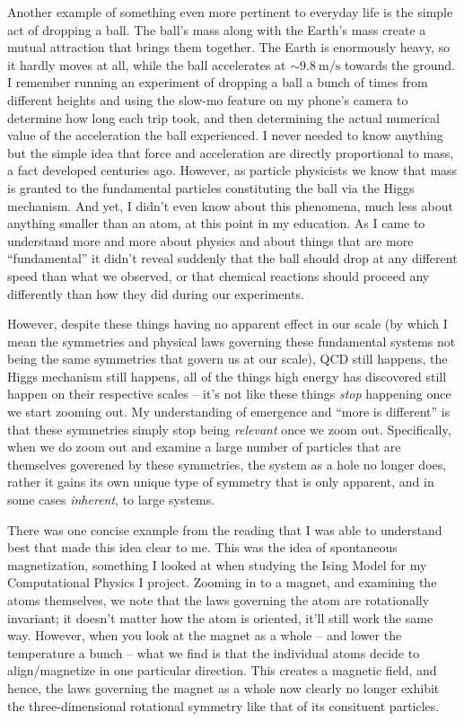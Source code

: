 Another example of something even more pertinent to everyday life is the simple act of dropping a ball. The ball's mass along with the Earth's mass create a mutual attraction that brings them together. The Earth is enormously heavy, so it hardly moves at all, while the ball accelerates at $\sim\qty{9.8}{\meter\per\second}$ towards the ground. I remember running an experiment of dropping a ball a bunch of times from different heights and using the slow-mo feature on my phone's camera to determine how long each trip took, and then determining the actual numerical value of the acceleration the ball experienced. I never needed to know anything but the simple idea that force and acceleration are directly proportional to mass, a fact developed centuries ago. However, as particle physicists we know that mass is granted to the fundamental particles constituting the ball via the Higgs mechanism. And yet, I didn't even know about this phenomena, much less about anything smaller than an atom, at this point in my education. As I came to understand more and more about physics and about things that are more ``fundamental'' it didn't reveal suddenly that the ball should drop at any different speed than what we observed, or that chemical reactions should proceed any differently than how they did during our experiments.

However, despite these things having no apparent effect in our scale (by which I mean the symmetries and physical laws governing these fundamental systems not being the same symmetries that govern us at our scale), QCD still happens, the Higgs mechanism still happens, all of the things high energy has discovered still happen on their respective scales -- it's not like these things \textit{stop} happening once we start zooming out. My understanding of emergence and ``more is different'' is that these symmetries simply stop being \textit{relevant} once we zoom out. Specifically, when we do zoom out and examine a large number of particles that are themselves goverened by these symmetries, the system as a hole no longer does, rather it gains its own unique type of symmetry that is only apparent, and in some cases \textit{inherent}, to large systems.

There was one concise example from the reading that I was able to understand best that made this idea clear to me. This was the idea of spontaneous magnetization, something I looked at when studying the Ising Model for my Computational Physics I project. Zooming in to a magnet, and examining the atoms themselves, we note that the laws governing the atom are rotationally invariant; it doesn't matter how the atom is oriented, it'll still work the same way. However, when you look at the magnet as a whole -- and lower the temperature a bunch -- what we find is that the individual atoms decide to align/magnetize in one particular direction. This creates a magnetic field, and hence, the laws governing the magnet as a whole now clearly no longer exhibit the three-dimensional rotational symmetry like that of its consituent particles.

